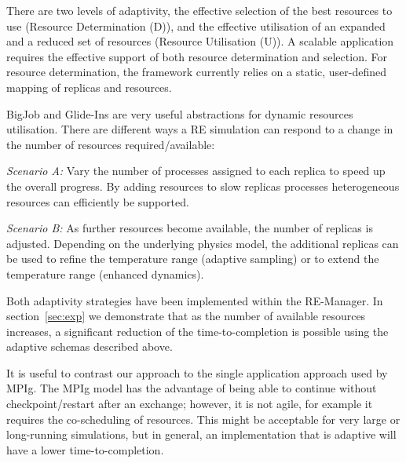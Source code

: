 \documentclass{rspublic}
\newcommand{\glidein}[1]{Glide-In }
\begin{document}
There are two levels of adaptivity, the effective selection of the best resources to use (Resource
Determination (D)), and the effective utilisation of an expanded and a reduced set of resources
(Resource Utilisation (U)).
A scalable application requires the effective support of both resource 
determination and selection. For resource determination, the framework 
currently relies on a static, user-defined mapping of replicas 
and resources.

BigJob and Glide-Ins are very useful abstractions for dynamic resources utilisation.
There are different ways a RE simulation can respond to a change in 
the number of resources required/available:  
\begin{compactitem}         
    \item {\it Scenario A:} Vary the number of processes assigned to each
    replica to speed up the overall progress. By adding resources
    to slow replicas processes heterogeneous resources 
    can efficiently be supported.
    
    \item {\it Scenario B:} As further resources become available, 
    the number of replicas is adjusted. Depending on the 
    underlying physics model, the additional replicas can be used
    to refine the temperature range (adaptive sampling) or to extend the
    temperature range (enhanced dynamics).
\end{compactitem}           
Both adaptivity strategies have been implemented within the RE-Manager. 
In section~\ref{sec:exp} we demonstrate that as the number of available
resources increases, a significant reduction of the time-to-completion 
is possible using the adaptive schemas described above. 

It is useful to contrast our approach to the single 
application approach used by MPIg. The MPIg model has the
advantage of being able to continue without checkpoint/restart after
an exchange; however, it is not agile, for example it requires the co-scheduling
of resources. This might be acceptable for very large 
or long-running simulations, but in general, an implementation 
that is adaptive will have a lower time-to-completion.



\end{document}
